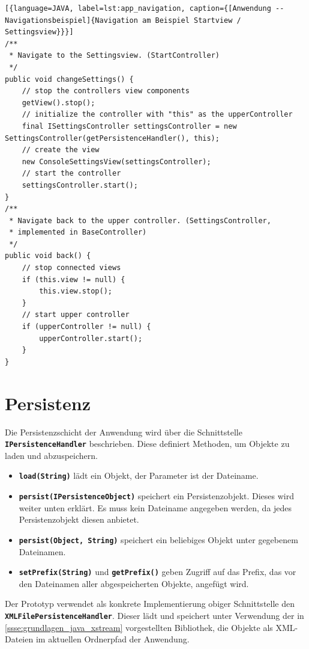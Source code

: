 \documentclass[
							a4paper, 
							11pt, 
							openany, 
							liststotoc,
							parskip=half, 
   							headings=normal
						]{scrreprt}
\begin{document}
{\begin{lstlisting}[{language=JAVA, label=lst:app_navigation, caption={[Anwendung -- Navigationsbeispiel]{Navigation am Beispiel Startview / Settingsview}}}]
/**
 * Navigate to the Settingsview. (StartController)
 */
public void changeSettings() {
	// stop the controllers view components
	getView().stop();
	// initialize the controller with "this" as the upperController
	final ISettingsController settingsController = new 												SettingsController(getPersistenceHandler(), this);
	// create the view
	new ConsoleSettingsView(settingsController);
	// start the controller
	settingsController.start();
}
/**
 * Navigate back to the upper controller. (SettingsController, 
 * implemented in BaseController)
 */
public void back() {
	// stop connected views
	if (this.view != null) {
		this.view.stop();
	}
	// start upper controller
	if (upperController != null) {
		upperController.start();
	}
}
\end{lstlisting}

\section{Persistenz} \label{se:anwendung_persistenz}
Die Persistenzschicht der Anwendung wird über die Schnittstelle \textbf{\texttt{IPersistenceHandler}} beschrieben. Diese definiert Methoden, um Objekte zu laden und abzuspeichern.

\begin{itemize}
	\item \textbf{\texttt{load(String)}} lädt ein Objekt, der Parameter ist der Dateiname.
	\item \textbf{\texttt{persist(IPersistenceObject)}} speichert ein Persistenzobjekt. Dieses wird weiter unten erklärt. Es muss kein Dateiname angegeben werden, da jedes Persistenzobjekt diesen anbietet.
	\item \textbf{\texttt{persist(Object, String)}} speichert ein beliebiges Objekt unter gegebenem Dateinamen.
	\item \textbf{\texttt{setPrefix(String)}} und \textbf{\texttt{getPrefix()}} geben Zugriff auf das Prefix, das vor den Dateinamen aller abgespeicherten Objekte, angefügt wird.
\end{itemize}

Der Prototyp verwendet als konkrete Implementierung obiger Schnittstelle den \textbf{\texttt{XML\-Fi\-le\-Per\-sis\-ten\-ce\-Han\-dler}}. Dieser lädt und speichert unter Verwendung der in \autoref{ssse:grundlagen_java_xstream} vorgestellten Bibliothek, die Objekte als XML-Dateien im aktuellen Ordnerpfad der Anwendung.

}
\end{document}
